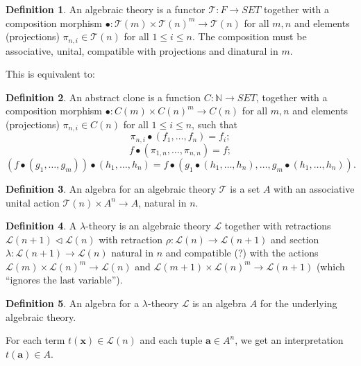 \documentclass{amsart}
\theoremstyle{definition}
\newtheorem{definition}{Definition}
\newcommand{\SET}{\ensuremath{SET}}
\begin{document}
  \begin{definition}
    An algebraic theory is a functor $ \mathcal T: F \to \SET $ together with a composition morphism $ \bullet: \mathcal T(m) \times \mathcal T(n)^m \to \mathcal T(n) $ for all $ m, n $ and elements (projections) $ \pi_{n, i} \in \mathcal T(n) $ for all $ 1 \leq i \leq n $. The composition must be associative, unital, compatible with projections and dinatural in $ m $.
  \end{definition}

  This is equivalent to:

  \begin{definition}
    An abstract clone is a function $ C : \mathbb N \to \SET $, together with a composition morphism $ \bullet: C(m) \times C(n)^m \to C(n) $ for all $ m, n $ and elements (projections) $ \pi_{n, i} \in C(n) $ for all $ 1 \leq i \leq n $, such that
    \[ \pi_{n, i} \bullet (f_1, \dots, f_n) = f_i; \]
    \[ f \bullet (\pi_{1, n}, \dots, \pi_{n, n}) = f; \]
    \[ (f \bullet (g_1, \dots, g_m)) \bullet (h_1, \dots, h_n) = f \bullet (g_1 \bullet (h_1, \dots, h_n), \dots, g_m \bullet (h_1, \dots, h_n)). \]
  \end{definition}

  \begin{definition}
    An algebra for an algebraic theory $ \mathcal T $ is a set $ A $ with an associative unital action $ \mathcal T(n) \times A^n \to A $, natural in $ n $.
  \end{definition}

  \begin{definition}
    A $ \lambda $-theory is an algebraic theory $ \mathcal L $ together with retractions $ \mathcal L(n + 1) \triangleleft \mathcal L(n) $ with retraction $ \rho: \mathcal L(n) \to \mathcal L(n + 1) $ and section $ \lambda: \mathcal L(n + 1) \to \mathcal L(n) $ natural in $ n $ and compatible (?) with the actions $ \mathcal L(m) \times \mathcal L(n)^m \to \mathcal L(n) $ and $ \mathcal L(m+1) \times \mathcal L(n)^m \to \mathcal L(n+1) $ (which ``ignores the last variable'').
  \end{definition}

  \begin{definition}
    An algebra for a $ \lambda $-theory $ \mathcal L $ is an algebra $ A $ for the underlying algebraic theory.
  \end{definition}
  For each term $ t(\mathbf x) \in \mathcal L(n) $ and each tuple $ \mathbf a \in A^n $, we get an interpretation $ t(\mathbf a) \in A $.
\end{document}
